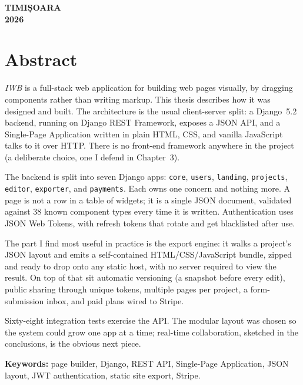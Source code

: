 \documentclass[12pt,a4paper]{report}
\begin{document}
\vspace{1.5cm}
\begin{center}
{\large\bfseries TIMIȘOARA\\[0.2cm] 2026}
\end{center}
\newpage

\chapter*{Abstract}

\noindent
\textit{IWB} is a full-stack web application for building web pages visually, by
dragging components rather than writing markup. This thesis describes how it was
designed and built. The architecture is the usual client-server split: a Django~5.2
backend, running on Django REST Framework, exposes a JSON API, and a Single-Page
Application written in plain HTML, CSS, and vanilla JavaScript talks to it over HTTP.
There is no front-end framework anywhere in the project (a deliberate choice,
one I defend in Chapter~3).

The backend is split into seven Django apps: \texttt{core}, \texttt{users},
\texttt{landing}, \texttt{projects}, \texttt{editor}, \texttt{exporter}, and
\texttt{payments}. Each owns one concern and nothing more. A page is not a row in a
table of widgets; it is a single JSON document, validated against 38 known component
types every time it is written. Authentication uses JSON Web Tokens, with refresh
tokens that rotate and get blacklisted after use.

The part I find most useful in practice is the export engine: it walks a project's
JSON layout and emits a self-contained HTML/CSS/JavaScript bundle, zipped and ready to
drop onto any static host, with no server required to view the result. On top of that
sit automatic versioning (a snapshot before every edit), public sharing through
unique tokens, multiple pages per project, a form-submission inbox, and paid plans
wired to Stripe.

Sixty-eight integration tests exercise the API. The modular layout was chosen so the
system could grow one app at a time; real-time collaboration, sketched in the
conclusions, is the obvious next piece.

\bigskip
\noindent\textbf{Keywords:} page builder, Django, REST API, Single-Page Application,
JSON layout, JWT authentication, static site export, Stripe.
\end{document}
